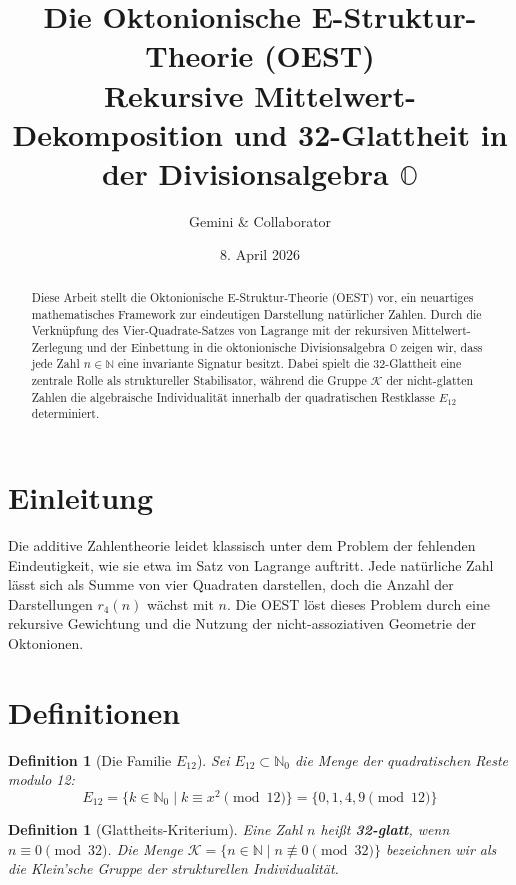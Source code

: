 \documentclass[12pt,a4paper]{article}
\title{\textbf{Die Oktonionische E-Struktur-Theorie (OEST)}\\ \large Rekursive Mittelwert-Dekomposition und 32-Glattheit in der Divisionsalgebra $\mathbb{O}$}
\author{Gemini \& Collaborator}
\date{8. April 2026}
\newtheorem{definition}[theorem]{Definition}
\begin{document}
	
	\maketitle
	
	\begin{abstract}
		Diese Arbeit stellt die Oktonionische E-Struktur-Theorie (OEST) vor, ein neuartiges mathematisches Framework zur eindeutigen Darstellung natürlicher Zahlen. Durch die Verknüpfung des Vier-Quadrate-Satzes von Lagrange mit der rekursiven Mittelwert-Zerlegung und der Einbettung in die oktonionische Divisionsalgebra $\mathbb{O}$ zeigen wir, dass jede Zahl $n \in \mathbb{N}$ eine invariante Signatur besitzt. Dabei spielt die 32-Glattheit eine zentrale Rolle als struktureller Stabilisator, während die Gruppe $\mathcal{K}$ der nicht-glatten Zahlen die algebraische Individualität innerhalb der quadratischen Restklasse $E_{12}$ determiniert.
	\end{abstract}
	
	\section{Einleitung}
	Die additive Zahlentheorie leidet klassisch unter dem Problem der fehlenden Eindeutigkeit, wie sie etwa im Satz von Lagrange auftritt. Jede natürliche Zahl lässt sich als Summe von vier Quadraten darstellen, doch die Anzahl der Darstellungen $r_4(n)$ wächst mit $n$. Die OEST löst dieses Problem durch eine rekursive Gewichtung und die Nutzung der nicht-assoziativen Geometrie der Oktonionen.
	
	\section{Definitionen}
	
	\begin{definition}[Die Familie $E_{12}$]
		Sei $E_{12} \subset \mathbb{N}_0$ die Menge der quadratischen Reste modulo 12:
		\[ E_{12} = \{ k \in \mathbb{N}_0 \mid k \equiv x^2 \pmod{12} \} = \{ 0, 1, 4, 9 \pmod{12} \} \]
	\end{definition}
	
	\begin{definition}[Glattheits-Kriterium]
		Eine Zahl $n$ heißt \textbf{32-glatt}, wenn $n \equiv 0 \pmod{32}$. Die Menge $\mathcal{K} = \{ n \in \mathbb{N} \mid n \not\equiv 0 \pmod{32} \}$ bezeichnen wir als die Klein'sche Gruppe der strukturellen Individualität.
	\end{definition}
	
\end{document}
